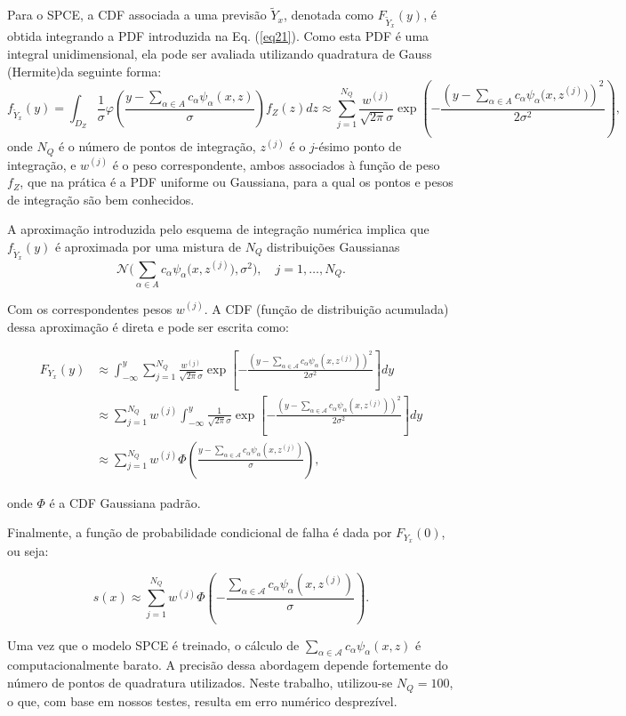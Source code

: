 Para o SPCE, a CDF associada a uma previsão \(\tilde{Y}_x\), denotada como \(F_{\tilde{Y}_x}(y)\), é obtida integrando a PDF introduzida na Eq. (\ref{eq21}). Como esta PDF é uma integral unidimensional, ela pode ser avaliada utilizando quadratura de Gauss (Hermite)da seguinte forma:
\begin{equation}
f_{\tilde{Y}_x}(y) = \int_{D_Z} \frac{1}{\sigma} \varphi \left( \frac{y - \sum_{\alpha \in A} c_\alpha \psi_\alpha(x,z)}{\sigma} \right) f_Z(z) dz
\approx \sum_{j=1}^{N_Q} \frac{w^{(j)}}{\sqrt{2\pi}\sigma} \exp \left( - \frac{\left(y - \sum_{\alpha \in A} c_\alpha \psi_\alpha \big(x, z^{(j)}\big)\right)^2}{2\sigma^2} \right),
\end{equation}
onde \(N_Q\) é o número de pontos de integração, \(z^{(j)}\) é o \(j\)-ésimo ponto de integração, e \(w^{(j)}\) é o peso correspondente, ambos associados à função de peso \(f_Z\), que na prática é a PDF uniforme ou Gaussiana, para a qual os pontos e pesos de integração são bem conhecidos.

A aproximação introduzida pelo esquema de integração numérica implica que \(f_{\tilde{Y}_x}(y)\) é aproximada por uma mistura de \(N_Q\) distribuições Gaussianas
\[
\mathcal{N} \Bigg( \sum_{\alpha \in A} c_\alpha \psi_\alpha \big(x, z^{(j)}\big), \sigma^2 \Bigg), \quad j=1,\dots,N_Q.
\]

Com os correspondentes pesos $w^{(j)}$. A CDF (função de distribuição acumulada) dessa aproximação é direta e pode ser escrita como:

\begin{align}
F_{Y_x}(y) 
&\approx \int_{-\infty}^{y} 
\sum_{j=1}^{N_Q} 
\frac{w^{(j)}}{\sqrt{2\pi}\sigma}
\exp\!\left[
-\frac{\left(
y - \sum_{\alpha \in \mathcal{A}} c_\alpha \psi_\alpha(x, z^{(j)})
\right)^2}{2\sigma^2}
\right] dy \nonumber \\[6pt]
&\approx 
\sum_{j=1}^{N_Q} 
w^{(j)} 
\int_{-\infty}^{y}
\frac{1}{\sqrt{2\pi}\sigma}
\exp\!\left[
-\frac{\left(
y - \sum_{\alpha \in \mathcal{A}} c_\alpha \psi_\alpha(x, z^{(j)})
\right)^2}{2\sigma^2}
\right] dy \nonumber \\[6pt]
&\approx 
\sum_{j=1}^{N_Q}
w^{(j)} 
\Phi\!\left(
\frac{
y - \sum_{\alpha \in \mathcal{A}} c_\alpha \psi_\alpha(x, z^{(j)})
}{\sigma}
\right),
\label{eq:29}
\end{align}

onde $\Phi$ é a CDF Gaussiana padrão.

Finalmente, a função de probabilidade condicional de falha é dada por $F_{Y_x}(0)$, ou seja:

\begin{equation}
s(x) \approx
\sum_{j=1}^{N_Q}
w^{(j)} 
\Phi\!\left(
-\frac{
\sum_{\alpha \in \mathcal{A}} c_\alpha \psi_\alpha(x, z^{(j)})
}{\sigma}
\right).
\label{eq:30}
\end{equation}

Uma vez que o modelo SPCE é treinado, o cálculo de 
$\sum_{\alpha \in \mathcal{A}} c_\alpha \psi_\alpha(x, z)$ 
é computacionalmente barato.  
A precisão dessa abordagem depende fortemente do número de pontos de quadratura utilizados.  
Neste trabalho, utilizou-se $N_Q = 100$, o que, com base em nossos testes, resulta em erro numérico desprezível.
 